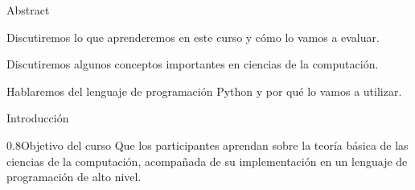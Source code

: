 \documentclass[mathserif]{beamer}
\subtitle{\bfseries%
  {Introducción}\\%
  {\tiny\it Agenda del curso, evaluación, conceptos básicos, introducción a Python}\\%
}
\begin{document}


\begin{frame}{Abstract}
    
    
    

	\begin{blurb}
		Discutiremos lo que aprenderemos en este curso y cómo lo vamos a evaluar.
		
		Discutiremos algunos conceptos importantes en ciencias de la computación.
		
		Hablaremos del lenguaje de programación Python y por qué lo vamos a utilizar.
	\end{blurb}
\end{frame}

\begin{frame}{Introducción}
    \begin{popblock}{0.8\textwidth}{Objetivo del curso}
    Que los participantes aprendan sobre la teoría básica de las ciencias de la computación, acompañada de su implementación en un lenguaje de programación de alto nivel.
    \end{popblock} 
    
    \begin{figure}
        \centering
        
    \end{figure}
\end{frame}
\end{document}
